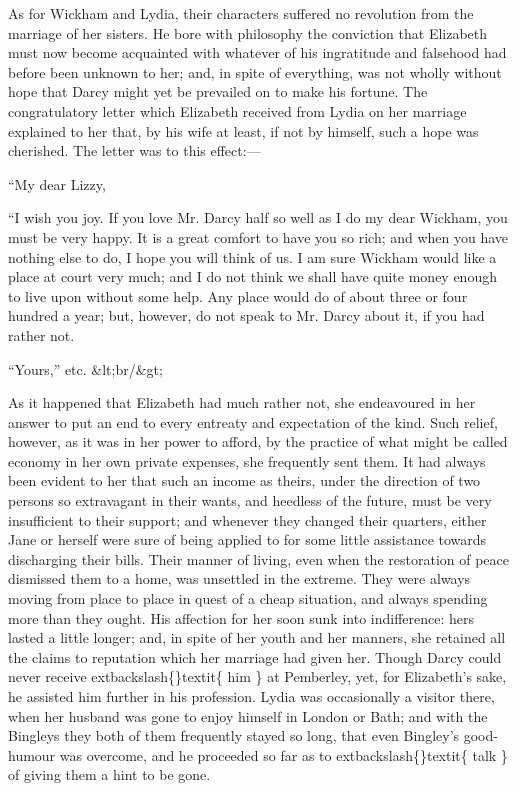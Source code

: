 \documentclass[10pt]{book}
\begin{document}
   As for Wickham and Lydia, their characters suffered no revolution from
the marriage of her sisters. He bore with philosophy the conviction that
Elizabeth must now become acquainted with whatever of his ingratitude
and
   falsehood had before been unknown to her; and, in spite of
everything, was not wholly without hope that Darcy might yet be
prevailed on to make his fortune. The congratulatory letter which
Elizabeth received from Lydia on her marriage explained to her that, by
his wife at least, if not by himself, such a hope was cherished. The
letter was to this effect:—
  

    “My dear Lizzy,
   

    “I wish you joy. If you love Mr. Darcy half so well as I do my dear
Wickham, you must be very happy. It is a great comfort to have you
so rich; and when you have nothing else to do, I hope you will
think of us. I am sure Wickham would like a place at court very
much; and I do not think we shall have quite money enough to live
upon without some help. Any place would do of about three or four
hundred a year; but, however, do not speak to Mr. Darcy about it,
if you had rather not.
   

    “Yours,” etc.
    &lt;br/&gt;

   As it happened that Elizabeth had much rather not, she endeavoured in
her answer to put an end to every entreaty and expectation of the kind.
Such relief, however, as it was in her power to afford, by the practice
of what might be called economy in her own private expenses, she
frequently sent them. It had always been evident to her that such an
income as theirs, under the direction of two persons so extravagant in
their wants, and heedless of the future, must be very insufficient to
their support; and whenever they changed their quarters, either Jane or
herself were sure of being applied to for some little assistance towards
discharging their bills. Their manner of living, even when the
restoration of peace dismissed them to a home, was unsettled in the
extreme. They were always moving from place to place
   in quest of a
cheap situation, and always spending more than they ought. His affection
for her soon sunk into indifference: hers lasted a little longer; and,
in spite of her youth and her manners, she retained all the claims to
reputation which her marriage had given her. Though Darcy could never
receive
   	extbackslash\{\}textit\{
    him
   \}
   at Pemberley, yet, for Elizabeth’s sake, he assisted him
further in his profession. Lydia was occasionally a visitor there, when
her husband was gone to enjoy himself in London or Bath; and with the
Bingleys they both of them frequently stayed so long, that even
Bingley’s good-humour was overcome, and he proceeded so far as to
   	extbackslash\{\}textit\{
    talk
   \}
   of giving them a hint to be gone.
  
\end{document}
